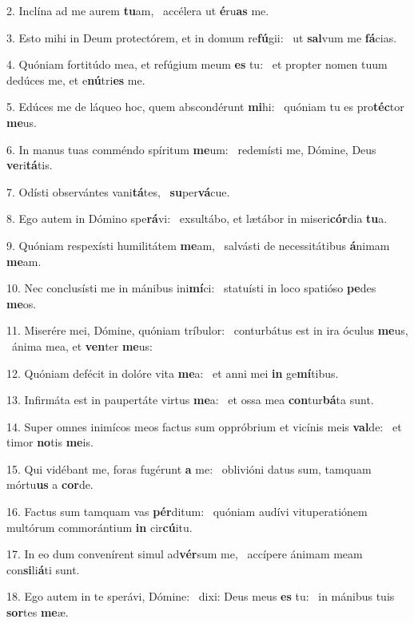 2. Inclína ad me aurem \textbf{tu}am, \ast\  accélera ut \textbf{é}ru\textbf{as} me.\

3. Esto mihi in Deum protectórem, et in domum re\textbf{fú}gii: \ast\  ut \textbf{sal}vum me \textbf{fá}cias.\

4. Quóniam fortitúdo mea, et refúgium meum \textbf{es} tu: \ast\  et propter nomen tuum dedúces me, et e\textbf{nú}tri\textbf{es} me.\

5. Edúces me de láqueo hoc, quem abscondérunt \textbf{mi}hi: \ast\  quóniam tu es pro\textbf{téc}tor \textbf{me}us.\

6. In manus tuas comméndo spíritum \textbf{me}um: \ast\  redemísti me, Dómine, Deus \textbf{ve}ri\textbf{tá}tis.\

7. Odísti observántes vani\textbf{tá}tes, \ast\  \textbf{su}per\textbf{vá}cue.\

8. Ego autem in Dómino spe\textbf{rá}vi: \ast\  exsultábo, et lætábor in miseri\textbf{cór}dia \textbf{tu}a.\

9. Quóniam respexísti humilitátem \textbf{me}am, \ast\  salvásti de necessitátibus \textbf{á}nimam \textbf{me}am.\

10. Nec conclusísti me in mánibus ini\textbf{mí}ci: \ast\  statuísti in loco spatióso \textbf{pe}des \textbf{me}os.\

11. Miserére mei, Dómine, quóniam tríbulor: \dag\  conturbátus est in ira óculus \textbf{me}us, \ast\  ánima mea, et \textbf{ven}ter \textbf{me}us:\

12. Quóniam defécit in dolóre vita \textbf{me}a: \ast\  et anni mei \textbf{in} ge\textbf{mí}tibus.\

13. Infirmáta est in paupertáte virtus \textbf{me}a: \ast\  et ossa mea \textbf{con}tur\textbf{bá}ta sunt.\

14. Super omnes inimícos meos factus sum oppróbrium et vicínis meis \textbf{val}de: \ast\  et timor \textbf{no}tis \textbf{me}is.\

15. Qui vidébant me, foras fugérunt \textbf{a} me: \ast\  oblivióni datus sum, tamquam mórtu\textbf{us} a \textbf{cor}de.\

16. Factus sum tamquam vas \textbf{pér}ditum: \ast\  quóniam audívi vituperatiónem multórum commorántium \textbf{in} cir\textbf{cú}itu.\

17. In eo dum convenírent simul ad\textbf{vér}sum me, \ast\  accípere ánimam meam con\textbf{si}li\textbf{á}ti sunt.\

18. Ego autem in te sperávi, Dómine: \dag\  dixi: Deus meus \textbf{es} tu: \ast\  in mánibus tuis \textbf{sor}tes \textbf{me}æ.\

